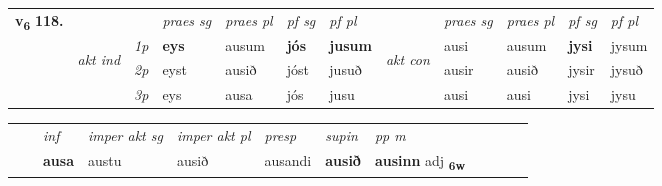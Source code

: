 \begin{tabular}{llllllllllll} \toprule
\multirow{4}{*}{{{\textbf{v{\textsubscript{6}}} \Large{\textbf{118.}}}}}  & &   &  \textit{praes sg}  & \textit{praes pl}  &\textit{ pf sg} & \textit{pf pl} &  &  \textit{praes sg}  & \textit{praes pl}  & \textit{pf sg} & \textit{pf pl } \\*
	\cmidrule{4-7} \cmidrule{9-12}
 & \multirow{3}{*}{\begin{turn}{90}\textit{akt ind}\end{turn}} & {\textit{1p}} & \textbf{eys} & ausum    & \textbf{jós} & \textbf{jusum} & \multirow{3}{*}{\begin{turn}{90}\textit{akt con}\end{turn}} &ausi & ausum & \textbf{jysi} & jysum\\*
& &  {\textit{2p}} &  eyst  & ausið   & jóst & jusuð & & ausir & ausið & jysir & jysuð \\*
& &  {\textit{3p}} & eys & ausa   & jós & jusu & & ausi & ausi& jysi & jysu  \\*
\cmidrule{4-7} \cmidrule{9-12}
\end{tabular}


\begin{tabular}{llllllllllll}
 & & \textit{inf} & \textit{imper akt sg} & \textit{imper akt pl}   & \textit{presp} & \textit{supin}  & \textit{pp m}     \\*
  & & \textbf{ausa} & austu  & ausið   & ausandi &  \textbf{ausið}  & \textbf{ausinn} adj \textbf{\textsubscript{6w}} \\*
\cmidrule{1-12}
\end{tabular}



